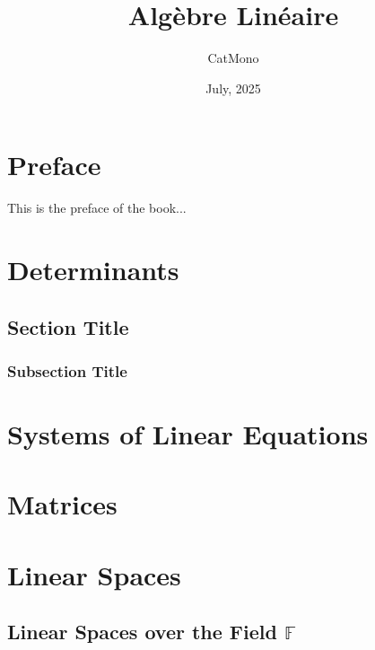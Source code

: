 \documentclass[11pt]{elegantbook}
\title{Algèbre Linéaire} %
\author{CatMono} %
\date{July, 2025} %
\begin{document}
\maketitle %

\frontmatter        %
\tableofcontents    %

\chapter{Preface}   %
This is the preface of the book...

\mainmatter         %

\chapter{Determinants} %
\section{Section Title} %
\subsection{Subsection Title} %

\chapter{Systems of Linear Equations}

\chapter{Matrices}

\chapter{Linear Spaces}
\section{Linear Spaces over the Field \(\mathbb{F}\)}
\end{document}
